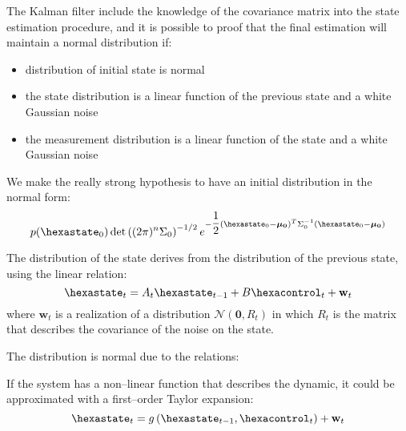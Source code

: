 The Kalman filter include the knowledge of the covariance matrix into the state estimation procedure, and it is possible to proof that the final estimation will maintain a normal distribution if:
\begin{itemize}
\item distribution of initial state is normal
\item the state distribution is a linear function of the previous state and a white Gaussian noise
\item the measurement distribution  is a linear function of the state and a white Gaussian noise
\end{itemize}

We make the really strong hypothesis to have an initial distribution in the normal form:
\begin{equation}
p(\hexastate_0) \det\braces{(2\pi)^{n}\Sigma_0}^{-1/2} e^{-\dfrac{1}{2}\braces{\hexastate_0 - \boldsymbol{\mu_0}}^T \Sigma_{0}^{-1}\braces{\hexastate_0 - \boldsymbol{\mu_0}}}
\end{equation}

The distribution of the state derives from the distribution of the previous state, using the linear relation:
\begin{equation}
\hexastate_t = A_t \hexastate_{t-1} + B \hexacontrol_t + \mathbf{w}_t
\end{equation}
where ${\mathbf{w}_t}$ is a realization of a distribution ${\mathcal{N}(\mathbf{0},R_t)}$ in which $R_t$ is the matrix that describes the covariance of the noise on the state.

The distribution is normal due to the relations:

If the system has a non--linear function that describes the dynamic, it could be approximated with a first--order Taylor expansion:
\begin{equation}
\hexastate_t = g\braces{\hexastate_{t-1},\hexacontrol_t} + \mathbf{w}_t
\end{equation}

